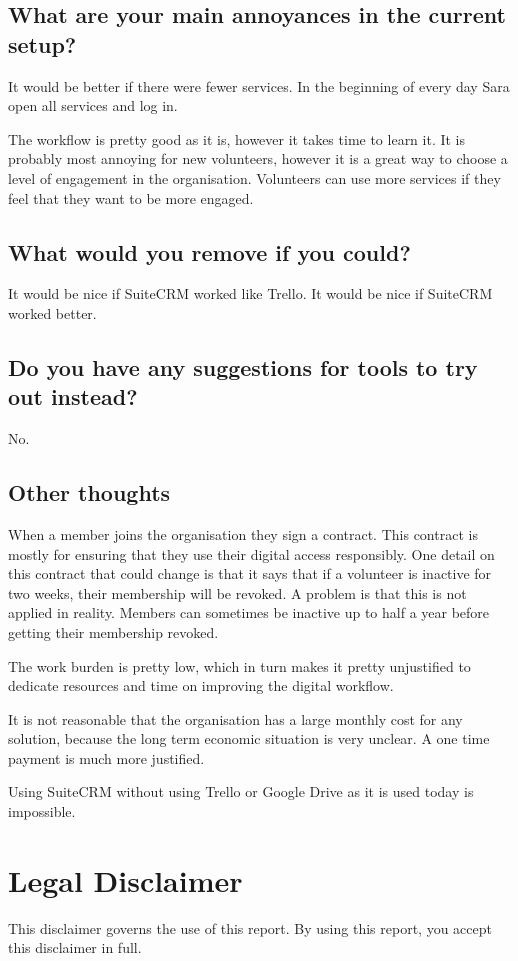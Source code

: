 \subsection{What are your main annoyances in the current setup?}
It would be better if there were fewer services. In the beginning of every day Sara open all services and log in.

The workflow is pretty good as it is, however it takes time to learn it. It is probably most annoying for new volunteers, however it is a great way to choose a level of engagement in the organisation. Volunteers can use more services if they feel that they want to be more engaged.

\subsection{What would you remove if you could?}
It would be nice if SuiteCRM worked like Trello. It would be nice if SuiteCRM worked better.

\subsection{Do you have any suggestions for tools to try out instead?}
No.

\subsection{Other thoughts}
When a member joins the organisation they sign a contract. This contract is mostly for ensuring that they use their digital access responsibly. One detail on this contract that could change is that it says that if a volunteer is inactive for two weeks, their membership will be revoked. A problem is that this is not applied in reality. Members can sometimes be inactive up to half a year before getting their membership revoked.

The work burden is pretty low, which in turn makes it pretty unjustified to dedicate resources and time on improving the digital workflow.

It is not reasonable that the organisation has a large monthly cost for any solution, because the long term economic situation is very unclear. A one time payment is much more justified.

Using SuiteCRM without using Trello or Google Drive as it is used today is impossible.

\section{Legal Disclaimer}
This disclaimer governs the use of this report. By using this report, you accept this disclaimer in full.

